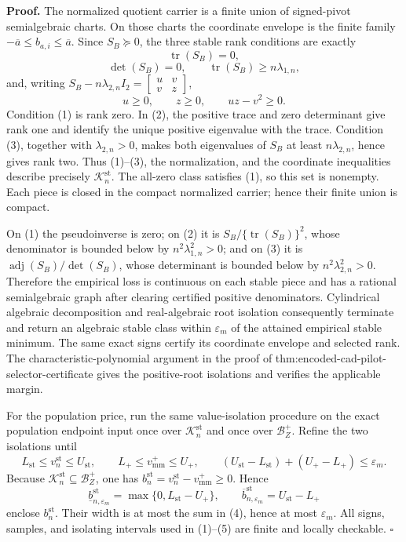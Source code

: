 \textbf{Proof.}
The normalized quotient carrier is a finite union of signed-pivot semialgebraic charts.  On those charts the coordinate envelope is the finite family \(-\overline a\le b_{a,i}\le\overline a\).  Since \(S_B\succeq0\), the three stable rank conditions are exactly
\[
\operatorname{tr}(S_B)=0,
\tag{1}
\]
\[
\det(S_B)=0,\qquad \operatorname{tr}(S_B)\ge n\lambda_{1,n},
\tag{2}
\]
and, writing \(S_B-n\lambda_{2,n}I_2=\begin{bmatrix}u&v\\v&z\end{bmatrix}\),
\[
u\ge0,\qquad z\ge0,\qquad uz-v^2\ge0.
\tag{3}
\]
Condition (1) is rank zero.  In (2), the positive trace and zero determinant give rank one and identify the unique positive eigenvalue with the trace.  Condition (3), together with \(\lambda_{2,n}>0\), makes both eigenvalues of \(S_B\) at least \(n\lambda_{2,n}\), hence gives rank two.  Thus (1)--(3), the normalization, and the coordinate inequalities describe precisely \(\mathcal K_n^{\mathrm{st}}\).  The all-zero class satisfies (1), so this set is nonempty.  Each piece is closed in the compact normalized carrier; hence their finite union is compact.

On (1) the pseudoinverse is zero; on (2) it is \(S_B/\{\operatorname{tr}(S_B)\}^2\), whose denominator is bounded below by \(n^2\lambda_{1,n}^2>0\); and on (3) it is \(\operatorname{adj}(S_B)/\det(S_B)\), whose determinant is bounded below by \(n^2\lambda_{2,n}^2>0\).  Therefore the empirical loss is continuous on each stable piece and has a rational semialgebraic graph after clearing certified positive denominators.  Cylindrical algebraic decomposition and real-algebraic root isolation consequently terminate and return an algebraic stable class within \(\varepsilon_m\) of the attained empirical stable minimum.  The same exact signs certify its coordinate envelope and selected rank.  The characteristic-polynomial argument in the proof of thm:encoded-cad-pilot-selector-certificate gives the positive-root isolations and verifies the applicable margin.

For the population price, run the same value-isolation procedure on the exact population endpoint input once over \(\mathcal K_n^{\mathrm{st}}\) and once over \(\mathcal B_Z^+\).  Refine the two isolations until
\[
L_{\mathrm{st}}\le v_n^{\mathrm{st}}\le U_{\mathrm{st}},
\qquad
L_+\le v_{\mathrm{mm}}^+\le U_+,
\qquad
(U_{\mathrm{st}}-L_{\mathrm{st}})+(U_+-L_+)\le\varepsilon_m.
\tag{4}
\]
Because \(\mathcal K_n^{\mathrm{st}}\subseteq\mathcal B_Z^+\), one has \(b_n^{\mathrm{st}}=v_n^{\mathrm{st}}-v_{\mathrm{mm}}^+\ge0\).  Hence
\[
\underline b_{n,\varepsilon_m}^{\mathrm{st}}
=\max\{0,L_{\mathrm{st}}-U_+\},
\qquad
\overline b_{n,\varepsilon_m}^{\mathrm{st}}
=U_{\mathrm{st}}-L_+
\tag{5}
\]
enclose \(b_n^{\mathrm{st}}\).  Their width is at most the sum in (4), hence at most \(\varepsilon_m\).  All signs, samples, and isolating intervals used in (1)--(5) are finite and locally checkable. \(\square\)